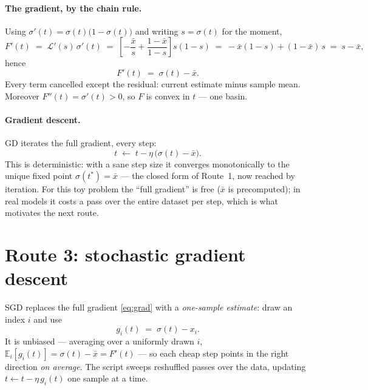 \documentclass[11pt]{article}
\newcommand{\sigmoid}{\sigma}
\newcommand{\xbar}{\bar{x}}
\begin{document}
\paragraph{The gradient, by the chain rule.}
Using $\sigmoid'(t) = \sigmoid(t)\bigl(1-\sigmoid(t)\bigr)$ and writing
$s = \sigmoid(t)$ for the moment,
\begin{equation*}
  F'(t)
  \;=\; \mathcal{L}'(s)\,\sigmoid'(t)
  \;=\; \left[-\frac{\xbar}{s} + \frac{1-\xbar}{1-s}\right] s(1-s)
  \;=\; -\xbar(1-s) + (1-\xbar)\,s
  \;=\; s - \xbar ,
\end{equation*}
hence
\begin{equation}
  F'(t) \;=\; \sigmoid(t) - \xbar .
  \label{eq:grad}
\end{equation}
Every term cancelled except the residual: current estimate minus sample
mean. Moreover $F''(t) = \sigmoid'(t) > 0$, so $F$ is convex in $t$ ---
one basin.

\paragraph{Gradient descent.}
GD iterates the full gradient, every step:
\begin{equation}
  t \;\leftarrow\; t - \eta\,\bigl(\sigmoid(t) - \xbar\bigr).
  \label{eq:gd}
\end{equation}
This is deterministic: with a sane step size it converges monotonically to
the unique fixed point $\sigmoid(t^{\ast}) = \xbar$ --- the closed form of
Route~1, now reached by iteration. For this toy problem the ``full
gradient'' is free ($\xbar$ is precomputed); in real models it costs a
pass over the entire dataset per step, which is what motivates the next
route.

\section{Route 3: stochastic gradient descent}

SGD replaces the full gradient \eqref{eq:grad} with a \emph{one-sample
estimate}: draw an index $i$ and use
\begin{equation}
  g_i(t) \;=\; \sigmoid(t) - x_i .
  \label{eq:sgdgrad}
\end{equation}
It is unbiased --- averaging over a uniformly drawn $i$,
$\mathbb{E}_i\!\left[g_i(t)\right] = \sigmoid(t) - \xbar = F'(t)$ --- so
each cheap step points in the right direction \emph{on average}. The
script sweeps reshuffled passes over the data, updating
$t \leftarrow t - \eta\, g_i(t)$ one sample at a time.
\end{document}
